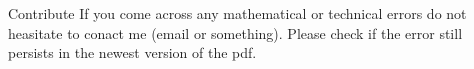 \documentclass[class=article, crop=false]{standalone}
\begin{document}
\begin{zettel}{Contribute}
If you come across any mathematical or technical errors do not heasitate to conact me (email or something). Please check if the error still persists in the newest version of the pdf.
\end{zettel}
\end{document}
